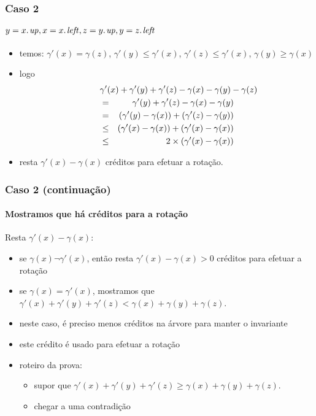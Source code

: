 \documentclass{beamer}
\begin{document}
\begin{frame}
\frametitle{Caso 2}
\framesubtitle{$y = \attrib{x}{up}, x = \attrib{x}{left}, z = \attrib{y}{up}, y = \attrib{z}{left}$}

\begin{itemize}
\item temos: $\gamma'(x) = \gamma(z)$, $\gamma'(y) \le \gamma'(x)$,
$\gamma'(z) \le \gamma'(x)$, $\gamma(y) \ge \gamma(x)$
\item logo 
\begin{eqnarray*}
\lefteqn{\gamma'(x) + \gamma'(y) + \gamma'(z) - \gamma(x) - \gamma(y) - \gamma(z)} \\
 & = & 
\gamma'(y) + \gamma'(z) - \gamma(x) - \gamma(y) \\
& = & (\gamma'(y) - \gamma(x)) + (\gamma'(z) - \gamma(y)) \\
& \le & (\gamma'(x) - \gamma(x)) + (\gamma'(x) - \gamma(x)) \\
& \le & 2 \times(\gamma'(x) - \gamma(x))
\end{eqnarray*}
\item resta $\gamma'(x) - \gamma(x)$ créditos para efetuar a rotação.
\end{itemize}
\end{frame}

\begin{frame}
\frametitle{Caso 2 (continuação)}
\framesubtitle{Mostramos que há créditos para a rotação}

Resta $\gamma'(x) - \gamma(x)$:
\begin{itemize}
\item se $\gamma(x) \neg \gamma'(x)$, então resta $\gamma'(x) - \gamma(x) > 0$ créditos para efetuar a rotação
\pause
\item se $\gamma(x) = \gamma'(x)$, mostramos que
$\gamma'(x) + \gamma'(y) + \gamma'(z) < \gamma(x) + \gamma(y) + \gamma(z)$.
\item neste caso, é preciso menos créditos na árvore para manter o invariante
\item este crédito é usado para efetuar a rotação
\item roteiro da prova:
\begin{itemize}
\item supor que 
$\gamma'(x) + \gamma'(y) + \gamma'(z) \ge \gamma(x) + \gamma(y) + \gamma(z)$.
\item chegar a uma contradição
\end{itemize}
\end{itemize}
\end{frame}
\end{document}

